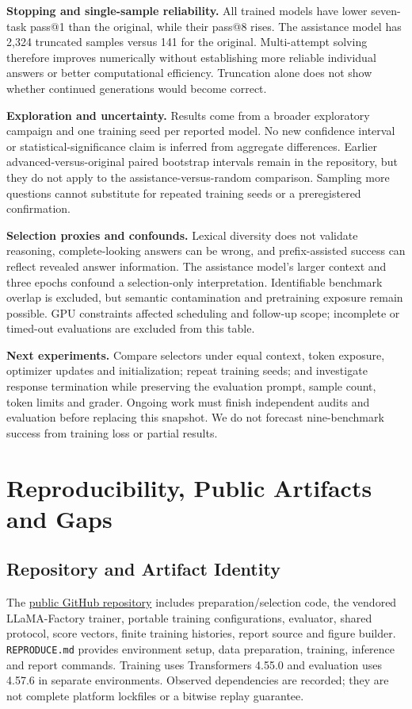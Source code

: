\documentclass[10pt,letterpaper]{article}
\begin{document}
\textbf{Stopping and single-sample reliability.} All trained models have lower seven-task pass@1 than the original, while their pass@8 rises. The assistance model has 2,324 truncated samples versus 141 for the original. Multi-attempt solving therefore improves numerically without establishing more reliable individual answers or better computational efficiency. Truncation alone does not show whether continued generations would become correct.

\textbf{Exploration and uncertainty.} Results come from a broader exploratory campaign and one training seed per reported model. No new confidence interval or statistical-significance claim is inferred from aggregate differences. Earlier advanced-versus-original paired bootstrap intervals remain in the repository, but they do not apply to the assistance-versus-random comparison. Sampling more questions cannot substitute for repeated training seeds or a preregistered confirmation.

\textbf{Selection proxies and confounds.} Lexical diversity does not validate reasoning, complete-looking answers can be wrong, and prefix-assisted success can reflect revealed answer information. The assistance model's larger context and three epochs confound a selection-only interpretation. Identifiable benchmark overlap is excluded, but semantic contamination and pretraining exposure remain possible. GPU constraints affected scheduling and follow-up scope; incomplete or timed-out evaluations are excluded from this table.

\textbf{Next experiments.} Compare selectors under equal context, token exposure, optimizer updates and initialization; repeat training seeds; and investigate response termination while preserving the evaluation prompt, sample count, token limits and grader. Ongoing work must finish independent audits and evaluation before replacing this snapshot. We do not forecast nine-benchmark success from training loss or partial results.

\newpage
\section{Reproducibility, Public Artifacts and Gaps}
\subsection{Repository and Artifact Identity}
The \href{https://github.com/rohitsalla/reasoning-sft-project1}{public GitHub repository} includes preparation/selection code, the vendored LLaMA-Factory trainer, portable training configurations, evaluator, shared protocol, score vectors, finite training histories, report source and figure builder. \texttt{REPRODUCE.md} provides environment setup, data preparation, training, inference and report commands. Training uses Transformers 4.55.0 and evaluation uses 4.57.6 in separate environments. Observed dependencies are recorded; they are not complete platform lockfiles or a bitwise replay guarantee.
\end{document}
